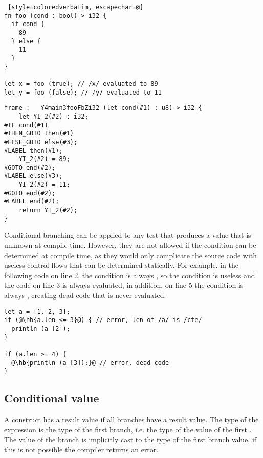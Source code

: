 \begin{lstlisting} [style=coloredverbatim, escapechar=@]
fn foo (cond : bool)-> i32 {
  if cond {
    89
  } else {
    11
  }
}

let x = foo (true); // /x/ evaluated to 89
let y = foo (false); // /y/ evaluated to 11
\end{lstlisting}


\begin{lstlisting}[style=intermediateVerb, caption=Simple condition, label=lst:if_cond_simple]
frame :  _Y4main3fooFbZi32 (let cond(#1) : u8)-> i32 {
    let YI_2(#2) : i32;
#IF cond(#1)
#THEN_GOTO then(#1)
#ELSE_GOTO else(#3);
#LABEL then(#1);
    YI_2(#2) = 89;
#GOTO end(#2);
#LABEL else(#3);
    YI_2(#2) = 11;
#GOTO end(#2);
#LABEL end(#2);
    return YI_2(#2);
}
\end{lstlisting}



Conditional branching can be applied to any test that produces a 
value that is unknown at compile time. However, they are not allowed if the
condition can be determined at compile time, as they would only complicate the
source code with useless control flows that can be determined statically. For
example, in the following code on line 2, the condition is always ,
so the condition is useless and the code on line 3 is always evaluated, in
addition, on line 5 the condition is always , creating dead code
that is never evaluated.

\begin{lstlisting}[style=coloredverbatim, escapechar=@]
let a = [1, 2, 3];
if (@\hb{a.len <= 3}@) { // error, len of /a/ is /cte/
  println (a [2]);
}

if (a.len >= 4) {
  @\hb{println (a [3]);}@ // error, dead code
}
\end{lstlisting}

\subsection {Conditional value}
\label{sec:cond_value_type}

A  construct has a result value if all branches have a result value.
The type of the expression is the type of the first branch, i.e. the type of the
value of the first . The value of the  branch is
implicitly cast to the type of the first branch value, if this is not possible
the compiler returns an error.

